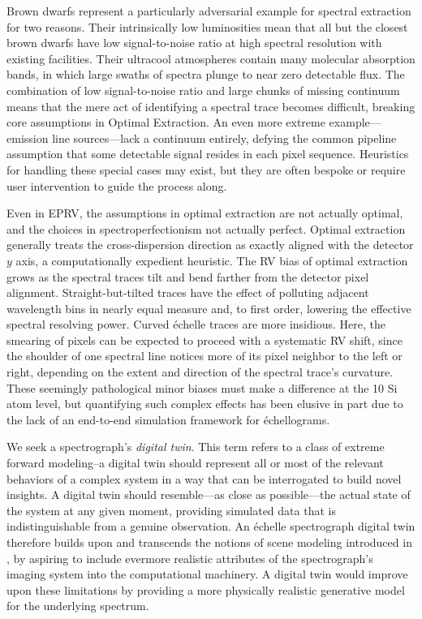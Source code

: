 \documentclass[twocolumn]{aastex63}
\begin{document}
Brown dwarfs represent a particularly adversarial example for spectral extraction for two reasons.  Their intrinsically low luminosities mean that all but the closest brown dwarfs have low signal-to-noise ratio at high spectral resolution with existing facilities.  Their ultracool atmospheres contain many molecular absorption bands, in which large swaths of spectra plunge to near zero detectable flux.  The combination of low signal-to-noise ratio and large chunks of missing continuum means that the mere act of identifying a spectral trace becomes difficult, breaking core assumptions in Optimal Extraction.  An even more extreme example---emission line sources---lack a continuum entirely, defying the common pipeline assumption that some detectable signal resides in each pixel sequence.  Heuristics for handling these special cases may exist, but they are often bespoke or require user intervention to guide the process along.

Even in EPRV, the assumptions in optimal extraction are not actually optimal, and the choices in spectroperfectionism not actually perfect.  Optimal extraction generally treats the cross-dispersion direction as exactly aligned with the detector $y$ axis, a computationally expedient heuristic. The RV bias of optimal extraction grows as the spectral traces tilt and bend farther from the detector pixel alignment.  Straight-but-tilted traces have the effect of polluting adjacent wavelength bins in nearly equal measure and, to first order, lowering the effective spectral resolving power.  Curved \'echelle traces are more insidious.  Here, the smearing of pixels can be expected to proceed with a systematic RV shift, since the shoulder of one spectral line notices more of its pixel neighbor to the left or right, depending on the extent and direction of the spectral trace's curvature.  These seemingly pathological minor biases must make a difference at the 10 Si atom level, but quantifying such complex effects has been elusive in part due to the lack of an end-to-end simulation framework for \'echellograms.

We seek a spectrograph's \emph{digital twin}.  This term refers to a class of extreme forward modeling--a digital twin should represent all or most of the relevant behaviors of a complex system in a way that can be interrogated to build novel insights.  A digital twin should resemble---as close as possible---the actual state of the system at any given moment, providing simulated data that is indistinguishable from a genuine observation.  An \'echelle spectrograph digital twin therefore builds upon and transcends the notions of scene modeling introduced in \citet{2010PASP..122..248B}, by aspiring to include evermore realistic attributes of the spectrograph's imaging system into the computational machinery.  A digital twin would improve upon these limitations by providing a more physically realistic generative model for the underlying spectrum.
\end{document}
